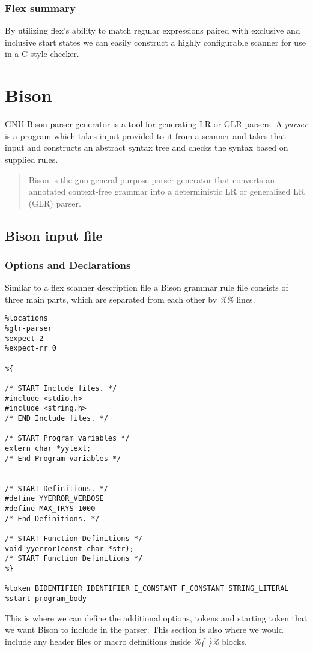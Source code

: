\subsubsection{Flex summary}
By utilizing flex's ability to match regular expressions paired with exclusive 
and inclusive start states we can easily construct a highly configurable 
scanner for use in a C style checker. 

\section{Bison}
GNU Bison parser generator is a tool for generating LR or GLR parsers.
A \emph{parser} is a program which takes input provided to it from a scanner
and takes that input and constructs an abstract syntax tree and checks the 
syntax based on supplied rules.
\begin{quote}
Bison is the gnu general-purpose parser generator that converts an annotated 
context-free grammar into a deterministic LR or generalized LR (GLR) parser.
\citep*{BISON} 
\end{quote}


\subsection{Bison input file}

\subsubsection{Options and Declarations}

Similar to a flex scanner description file a Bison grammar rule file consists 
of three main parts, which are separated from each other by \emph{\%\%} lines.
\begingroup
    \fontsize{8pt}{8pt}\selectfont
\begin{verbatim}
%locations
%glr-parser
%expect 2
%expect-rr 0

%{

/* START Include files. */
#include <stdio.h>
#include <string.h>
/* END Include files. */

/* START Program variables */
extern char *yytext;
/* End Program variables */


/* START Definitions. */
#define YYERROR_VERBOSE
#define MAX_TRYS 1000
/* End Definitions. */

/* START Function Definitions */
void yyerror(const char *str);
/* START Function Definitions */
%}

%token BIDENTIFIER IDENTIFIER I_CONSTANT F_CONSTANT STRING_LITERAL
%start program_body

\end{verbatim}
\endgroup
\noindent This is where we can define the additional options, tokens and 
starting token that we want Bison to include in the parser. This section is 
also where we would include any header files or macro definitions inside 
\emph{\%\{ \}\%} blocks.


